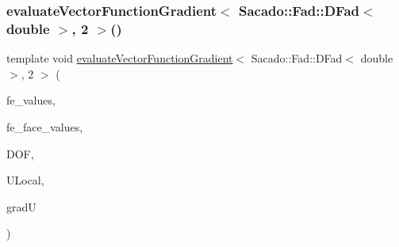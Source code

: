 \subsubsection{\texorpdfstring{evaluate\+Vector\+Function\+Gradient$<$ Sacado\+::\+Fad\+::\+D\+Fad$<$ double $>$, 2 $>$()}{evaluateVectorFunctionGradient< Sacado::Fad::DFad< double >, 2 >()}\hspace{0.1cm}{\footnotesize\ttfamily [3/4]}}
{\footnotesize\ttfamily template void \mbox{\hyperlink{group___evaluation_functions_ga9608539d601a91aff1ba01ccc720fbe0}{evaluate\+Vector\+Function\+Gradient}}$<$ Sacado\+::\+Fad\+::\+D\+Fad$<$ double $>$, 2 $>$ (\begin{DoxyParamCaption}\item[{const F\+E\+Values$<$ 2 $>$ \&}]{fe\+\_\+values,  }\item[{const F\+E\+Face\+Values$<$ 2 $>$ \&}]{fe\+\_\+face\+\_\+values,  }\item[{unsigned int}]{D\+OF,  }\item[{Table$<$ 1, Sacado\+::\+Fad\+::\+D\+Fad$<$ double $>$$>$ \&}]{U\+Local,  }\item[{Table$<$ 3, Sacado\+::\+Fad\+::\+D\+Fad$<$ double $>$$>$ \&}]{gradU }\end{DoxyParamCaption})}

\mbox{\label{function_evaluations_8cc_a27075eb9170789806dc7fb366382e29d}} 
